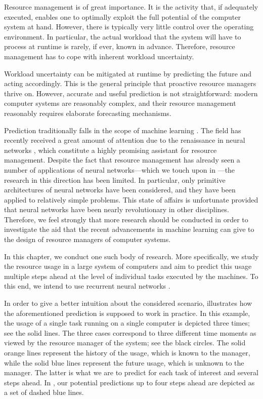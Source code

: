 Resource management is of great importance. It is the activity that, if
adequately executed, enables one to optimally exploit the full potential of the
computer system at hand. However, there is typically very little control over
the operating environment. In particular, the actual workload that the system
will have to process at runtime is rarely, if ever, known in advance. Therefore,
resource management has to cope with inherent workload uncertainty.

Workload uncertainty can be mitigated at runtime by predicting the future and
acting accordingly. This is the general principle that proactive resource
managers thrive on. However, accurate and useful prediction is not
straightforward: modern computer systems are reasonably complex, and their
resource management reasonably requires elaborate forecasting mechanisms.

Prediction traditionally falls in the scope of machine learning
\cite{hastie2013}. The field has recently received a great amount of attention
due to the renaissance in neural networks \cite{goodfellow2016}, which
constitute a highly promising assistant for resource management. Despite the
fact that resource management has already seen a number of applications of
neural networks---which we touch upon in ---the research in
this direction has been limited. In particular, only primitive architectures of
neural networks have been considered, and they have been applied to relatively
simple problems. This state of affairs is unfortunate provided that neural
networks have been nearly revolutionary in other disciplines. Therefore, we feel
strongly that more research should be conducted in order to investigate the aid
that the recent advancements in machine learning can give to the design of
resource managers of computer systems.

In this chapter, we conduct one such body of research. More specifically, we
study the resource usage in a large system of computers and aim to predict this
usage multiple steps ahead at the level of individual tasks executed by the
machines. To this end, we intend to use recurrent neural networks
\cite{goodfellow2016}.

In order to give a better intuition about the considered scenario,
 illustrates how the aforementioned prediction is
supposed to work in practice. In this example, the  usage of a single
task running on a single computer is depicted three times; see the solid lines.
The three cases correspond to three different time moments as viewed by the
resource manager of the system; see the black circles. The solid orange lines
represent the history of the usage, which is known to the manager, while the
solid blue lines represent the future usage, which is unknown to the manager.
The latter is what we are to predict for each task of interest and several steps
ahead. In , our potential predictions up to four steps
ahead are depicted as a set of dashed blue lines.

